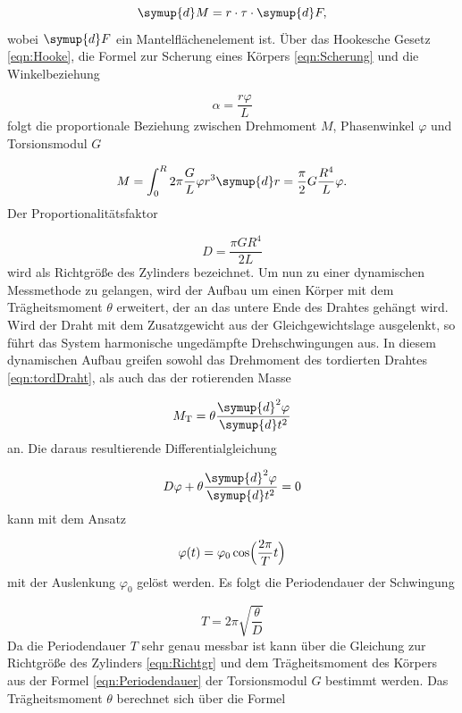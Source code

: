 \begin{equation}
  \symup{d}M = r \cdot \tau \cdot \symup{d} F,
\end{equation}
wobei $\symup{d}F$ ein Mantelflächenelement ist.
Über das Hookesche Gesetz \eqref{eqn:Hooke}, die Formel zur Scherung eines
Körpers \eqref{eqn:Scherung} und die Winkelbeziehung

\begin{equation}
  \alpha = \frac{r\varphi}{L}
\end{equation}
folgt die proportionale Beziehung zwischen Drehmoment $M$, Phasenwinkel
$\varphi$ und Torsionsmodul $G$

\begin{equation}
  M = \int_{0}^{R} 2\pi \frac{G}{L} \varphi r^3 \symup{d}r = \frac{\pi}{2} G
  \frac{R^4}{L} \varphi.
  \label{eqn:tordDraht}
\end{equation}
Der Proportionalitätsfaktor

\begin{equation}
  D = \frac{\pi G R^4}{2L}
  \label{eqn:Richtgr}
\end{equation}
wird als Richtgröße des Zylinders bezeichnet.
Um nun zu einer dynamischen Messmethode zu gelangen, wird der Aufbau
um einen Körper mit dem Trägheitsmoment $\theta$ erweitert, der an das untere
Ende des Drahtes gehängt wird.
Wird der Draht mit dem Zusatzgewicht aus der Gleichgewichtslage ausgelenkt, so
führt das System harmonische ungedämpfte Drehschwingungen aus. In diesem
dynamischen Aufbau greifen sowohl das Drehmoment des tordierten Drahtes
\eqref{eqn:tordDraht}, als auch das der rotierenden Masse

\begin{equation}
  M_\text{T} = \theta \frac{\symup{d}^2\varphi}{\symup{d}t^2}
\end{equation}
an.
Die daraus resultierende Differentialgleichung

\begin{equation}
  D \varphi + \theta \frac{\symup{d}^2\varphi}{\symup{d}t^2} = 0
\end{equation}
kann mit dem Ansatz

\begin{equation}
  \varphi(t) = \varphi_0 \cos \Bigl(\frac{2\pi}{T}t\Bigr)
\end{equation}
mit der Auslenkung $\varphi_0$ gelöst werden.
Es folgt die Periodendauer der Schwingung

\begin{equation}
  T = 2\pi \sqrt{\frac{\theta}{D}}
  \label{eqn:Periodendauer}
\end{equation}
Da die Periodendauer $T$ sehr genau messbar ist kann über die
Gleichung zur Richtgröße des Zylinders \eqref{eqn:Richtgr} und dem
Trägheitsmoment des Körpers aus der Formel \eqref{eqn:Periodendauer} der
Torsionsmodul $G$ bestimmt werden.
Das Trägheitsmoment $\theta$ berechnet sich über die Formel

